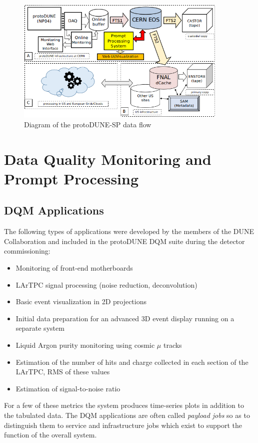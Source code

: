 \documentclass{webofc}
\newcommand{\pd}{protoDUNE\xspace}
\begin{document}
\begin{figure}[tb]
\centering\includegraphics[width=0.9\textwidth]{figures/protoDUNE_data_flow_2018_v1.png}
\caption{\label{fig:dataflow}Diagram of the protoDUNE-SP data flow}
\end{figure}


\section{Data Quality Monitoring and Prompt Processing}
\subsection{DQM Applications}
The following types of applications were developed by the members of the DUNE Collaboration and
included in the \pd DQM suite during the detector
commissioning:
\begin{itemize}
\item Monitoring of front-end motherboards
\item LArTPC signal processing (noise reduction, deconvolution)
\item Basic event visualization in 2D projections
\item Initial data preparation for an advanced 3D event display running on a separate system
\item Liquid Argon purity monitoring using cosmic $\mu$ tracks
\item Estimation of the number of hits and charge collected in each section of the LArTPC, RMS of these values
\item Estimation of signal-to-noise ratio
\end{itemize}

\noindent For a few of these metrics the system produces time-series plots in addition to the tabulated data.
The DQM applications are often called \textit{payload jobs} so as to distinguish
them to service and infrastructure jobs which exist to support the function of the overall system.
\end{document}
